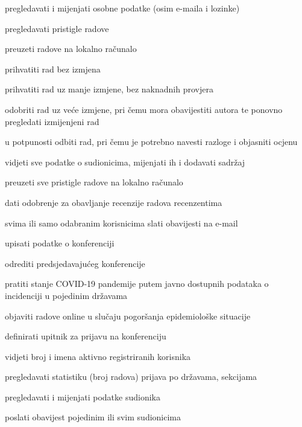 \begin{packed_enum}
\begin{packed_enum}
\begin{packed_enum}
						\item pregledavati i mijenjati osobne podatke (osim e-maila i lozinke)
						\item pregledavati pristigle radove
						\item preuzeti radove na lokalno računalo
						\item prihvatiti rad bez izmjena
						\item prihvatiti rad uz manje izmjene, bez naknadnih provjera
						\item odobriti rad uz veće izmjene, pri čemu mora obavijestiti autora te ponovno pregledati izmijenjeni rad
						\item u potpunosti odbiti rad, pri čemu je potrebno navesti razloge i objasniti ocjenu
					
					
					\end{packed_enum}
				
					\item  {}
				
					\begin{packed_enum}
				
						\item vidjeti sve podatke o sudionicima, mijenjati ih i dodavati sadržaj
						\item preuzeti sve pristigle radove na lokalno računalo
						\item dati odobrenje za obavljanje recenzije radova recenzentima
						\item svima ili samo odabranim korisnicima slati obavijesti na e-mail
					
				
					\end{packed_enum}
				
					\item  {}
				
					\begin{packed_enum}
				
						\item upisati podatke o konferenciji
						\item odrediti predsjedavajućeg konferencije
						\item pratiti stanje COVID-19 pandemije putem javno dostupnih podataka o incidenciji u pojedinim državama
						\item objaviti radove online u slučaju pogoršanja epidemiološke situacije
						\item definirati upitnik za prijavu na konferenciju
						\item vidjeti broj i imena aktivno registriranih korisnika
						\item pregledavati statistiku (broj radova) prijava po državama, sekcijama
						\item pregledavati i mijenjati podatke sudionika
						\item poslati obavijest pojedinim ili svim sudionicima 


\end{packed_enum}
\end{packed_enum}
\end{packed_enum}
